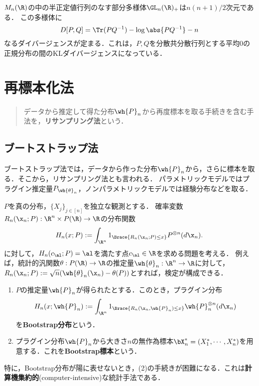 \documentclass[uplatex,dvipdfmx]{jsreport}
\begin{document}
\begin{example}[正規分布族のKL分離度]
    $M_n(\R)$の中の半正定値行列のなす部分多様体$\GL_n(\R)_+$は$n(n+1)/2$次元である．
    この多様体に
    \[D[P,Q]=\Tr(PQ^{-1})-\log\abs{PQ^{-1}}-n\]
    なるダイバージェンスが定まる．これは，$P,Q$を分散共分散行列とする平均$0$の正規分布の間のKLダイバージェンスになっている．
\end{example}

\chapter{再標本化法}

\begin{quotation}
    データから推定して得た分布$\wh{P}_n$から再度標本を取る手続きを含む手法を，\textbf{リサンプリング法}という．
\end{quotation}

\section{ブートストラップ法}

\begin{tcolorbox}[colframe=ForestGreen, colback=ForestGreen!10!white,breakable,colbacktitle=ForestGreen!40!white,coltitle=black,fonttitle=\bfseries\sffamily,
title=]
    ブートストラップ法では，データから作った分布$\wh{P}_n$から，さらに標本を取る．そこから，リサンプリング法とも言われる．
    パラメトリックモデルではプラグイン推定量$P_{\wh{\theta}_n}$，ノンパラメトリックモデルでは経験分布などを取る．
\end{tcolorbox}

\begin{model}[ブートストラップ法が適用可能な模型]
    $P$を真の分布，$\{X_j\}_{j\in[n]}$を独立な観測とする．
    確率変数$R_n(\x_n;P):\R^n\times P(\R)\to\R$の分布関数
    \[H_n(x;P):=\int_{\R^n}1_{\Brace{R_n(\x_n;P)\le x}}P^{\otimes n}(d\x_n).\]
    に対して，$H_n(c_\al;P)=\al$を満たす点$c_\al\in\R$を求める問題を考える．
    例えば，統計的汎関数$\theta:P(\R)\to\R$の推定量$\wh{\theta}_n:\R^n\to\R$に対して，$R_n(\x_n;P):=\sqrt{n}(\wh{\theta}_n(\x_n)-\theta(P))$とすれば，検定が構成できる．
    \begin{enumerate}
        \item $P$の推定量$\wh{P}_n$が得られたとする．このとき，プラグイン分布
        \[H_n(x;\wh{P}_n):=\int_{\R^n}1_{\Brace{R_n(\x_n,\wh{P}_n)\le x}}\wh{P}_n^{\otimes n}(d\x_n)\]
        を\textbf{Bootstrap分布}という．
        \item プラグイン分布$\wh{P}_n$から大きさ$n$の無作為標本$\bX^*_n=(X_1^*,\cdots,X^*_n)$を用意する．これを\textbf{Bootstrap標本}という．
    \end{enumerate}
    特に，Bootstrap分布が陽に表せないとき，(2)の手続きが困難になる．これは\textbf{計算機集約的}(computer-intensive)な統計手法である．
\end{model}
\end{document}
